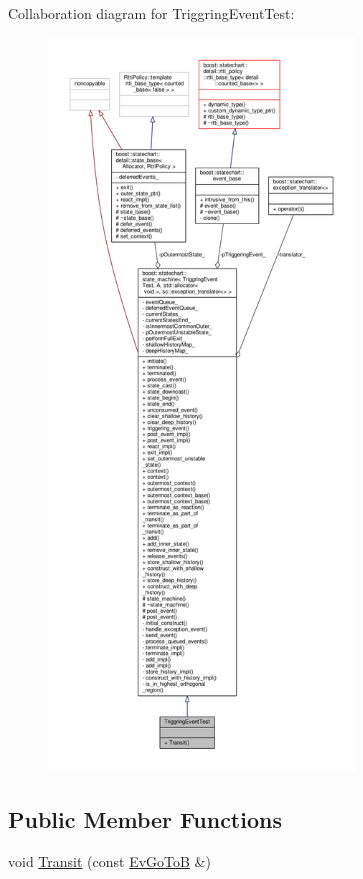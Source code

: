 Collaboration diagram for Triggring\+Event\+Test\+:
\nopagebreak
\begin{figure}[H]
\begin{center}
\leavevmode
\includegraphics[height=550pt]{struct_triggring_event_test__coll__graph}
\end{center}
\end{figure}
\subsection*{Public Member Functions}
\begin{DoxyCompactItemize}
\item 
void \mbox{\hyperlink{struct_triggring_event_test_aa24d7f5136f07fac2ed5678f205c9a89}{Transit}} (const \mbox{\hyperlink{struct_ev_go_to_b}{Ev\+Go\+ToB}} \&)
\end{DoxyCompactItemize}
